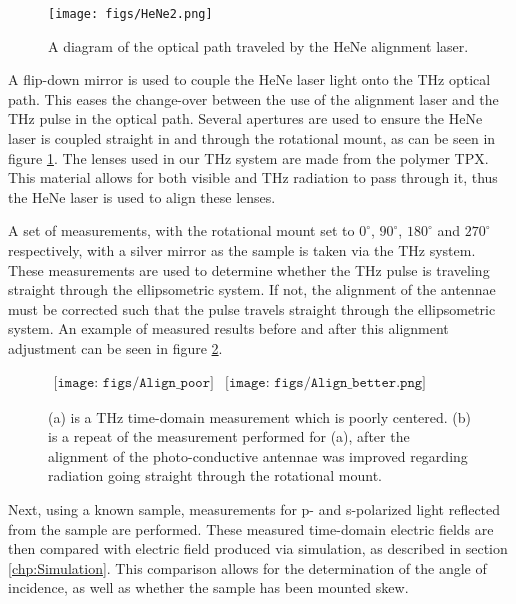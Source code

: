 \begin{figure}[H]
\begin{center}
	 \texttt{[image: figs/HeNe2.png]}
	 \caption[Diagram of HeNe alignment laser optical path]{A diagram of the optical path traveled by the HeNe alignment laser.}
   \label{fig:HeNe}
\end{center}
\end{figure}

A flip-down mirror is used to couple the HeNe laser light onto the THz optical path. This eases the change-over between the use of the alignment laser and the THz pulse in the optical path. Several apertures are used to ensure the HeNe laser is coupled straight in and through the rotational mount, as can be seen in figure \ref{fig:HeNe}. The lenses used in our THz system are made from the polymer TPX. This material allows for both visible and THz radiation to pass through it, thus the HeNe laser is used to align these lenses.

A set of measurements, with the rotational mount set to $0^{\circ}$, $90^{\circ}$, $180^{\circ}$ and $270^{\circ}$ respectively, with a silver mirror as the sample is taken via the THz system. These measurements are used to determine whether the THz pulse is traveling straight through the ellipsometric system. If not, the alignment of the antennae must be corrected such that the pulse travels straight through the ellipsometric system. An example of measured results before and after this alignment adjustment can be seen in figure \ref{fig:Align_center}.

\begin{figure}[H]
                \begin{center}$
								\begin{array}{cc}
                \texttt{[image: figs/Align\_poor]}&
                \texttt{[image: figs/Align\_better.png]}
								\end{array}$
								\end{center}
	\caption[Example of centering alignment]{(a) is a THz time-domain measurement which is poorly centered. (b) is a repeat of the measurement performed for (a), after the alignment of the photo-conductive antennae was improved regarding radiation going straight through the rotational mount.}
	\label{fig:Align_center}
\end{figure}

Next, using a known sample, measurements for p- and s-polarized light reflected from the sample are performed. These measured time-domain electric fields are then compared with electric field produced via simulation, as described in section \ref{chp:Simulation}. This comparison allows for the determination of the angle of incidence, as well as whether the sample has been mounted skew. 

